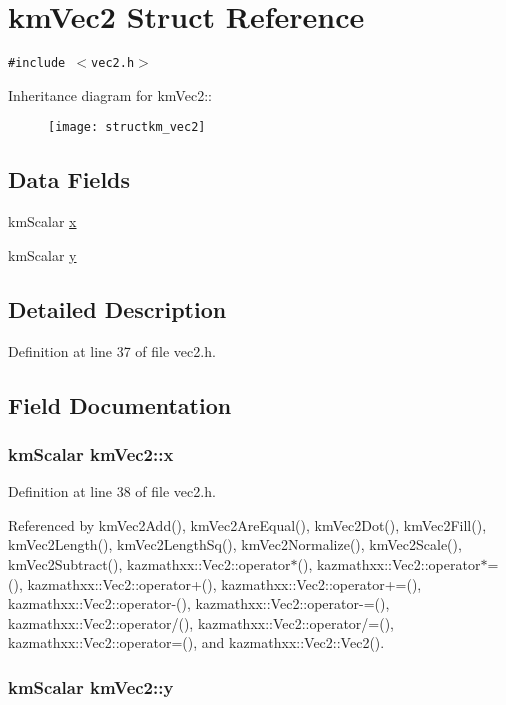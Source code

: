 \hypertarget{structkm_vec2}{
\section{kmVec2 Struct Reference}
\label{structkm_vec2}
}
{\tt \#include $<$vec2.h$>$}

Inheritance diagram for kmVec2::\begin{figure}[H]
\begin{center}
\leavevmode
\texttt{[image: structkm\_vec2]}
\end{center}
\end{figure}
\subsection*{Data Fields}
\begin{CompactItemize}
\item 
kmScalar \hyperlink{structkm_vec2_8f17399ac844ce3b973d09d28e78429a}{x}
\item 
kmScalar \hyperlink{structkm_vec2_21eee8f77413b24dd6a8a19314d61fed}{y}
\end{CompactItemize}


\subsection{Detailed Description}


Definition at line 37 of file vec2.h.

\subsection{Field Documentation}
\hypertarget{structkm_vec2_8f17399ac844ce3b973d09d28e78429a}{
\subsubsection[x]{\setlength{\rightskip}{0pt plus 5cm}kmScalar {\bf kmVec2::x}}}
\label{structkm_vec2_8f17399ac844ce3b973d09d28e78429a}




Definition at line 38 of file vec2.h.

Referenced by kmVec2Add(), kmVec2AreEqual(), kmVec2Dot(), kmVec2Fill(), kmVec2Length(), kmVec2LengthSq(), kmVec2Normalize(), kmVec2Scale(), kmVec2Subtract(), kazmathxx::Vec2::operator$\ast$(), kazmathxx::Vec2::operator$\ast$=(), kazmathxx::Vec2::operator+(), kazmathxx::Vec2::operator+=(), kazmathxx::Vec2::operator-(), kazmathxx::Vec2::operator-=(), kazmathxx::Vec2::operator/(), kazmathxx::Vec2::operator/=(), kazmathxx::Vec2::operator=(), and kazmathxx::Vec2::Vec2().\hypertarget{structkm_vec2_21eee8f77413b24dd6a8a19314d61fed}{
\subsubsection[y]{\setlength{\rightskip}{0pt plus 5cm}kmScalar {\bf kmVec2::y}}}
\label{structkm_vec2_21eee8f77413b24dd6a8a19314d61fed}




